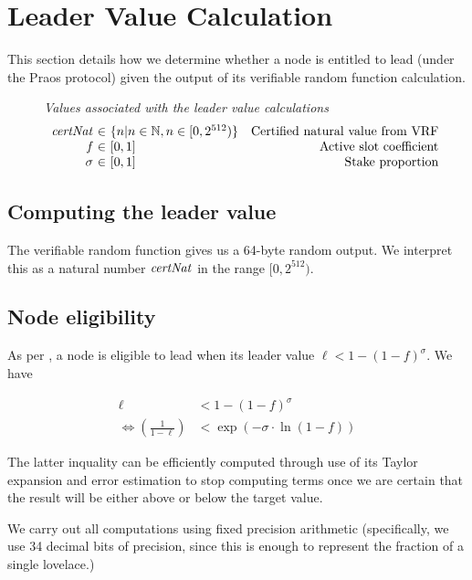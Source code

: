 \section{Leader Value Calculation}
\label{sec:leader-value-calc}

This section details how we determine whether a node is entitled to lead (under
the Praos protocol) given the output of its verifiable random function
calculation.

\begin{figure}
  \emph{Values associated with the leader value calculations}
  \begin{equation*}
  \begin{array}{r@{~\in~}lr}
    \var{certNat} & \{n | n \in \N, n \in [0,2^{512})\} & \text{Certified natural value from VRF} \\
    \var{f} & [0,1] & \text{Active slot coefficient} \\
    \sigma & [0,1] & \text{Stake proportion}
  \end{array}
  \end{equation*}
\end{figure}

\subsection{Computing the leader value}

The verifiable random function gives us a 64-byte random output. We interpret
this as a natural number $\mathit{certNat}$ in the range $[0,2^{512})$.

\subsection{Node eligibility}

As per \cite{ouroboros_praos}, a node is eligible to lead when its leader value
$\ell < 1 - (1 - f)^\sigma$. We have

\begin{align*}
  \ell & < 1 - (1 -f)^\sigma \\
  \iff \left(\frac{1}{1-\ell}\right) & < \exp{(-\sigma \cdot \ln{(1-f)})}
\end{align*}

The latter inquality can be efficiently computed through use of its Taylor
expansion and error estimation to stop computing terms once we are certain that
the result will be either above or below the target value.

We carry out all computations using fixed precision arithmetic (specifically, we
use 34 decimal bits of precision, since this is enough to represent the fraction
of a single lovelace.)

